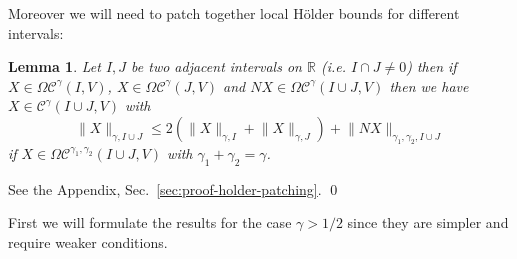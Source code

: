\documentclass[a4paper,12pt,reqno]{amsproc}
\newcommand{\NN}{N}
\newcommand{\CC}{\mathcal{C}}
\newcommand{\OCC}{\Omega \mathcal{C}}
\newcommand{\norm}[1]{\lVert #1\rVert}
\newtheorem{lemma}{Lemma}
\begin{document}
Moreover we will need to patch together local H\"older bounds for
different intervals:
\begin{lemma}
  \label{eq:holder-patching}
Let $I,J$ be two adjacent intervals on $\mathbb{R}$ (i.e. $I \cap J
\neq 0$) then if $X \in \OCC^{\gamma}(I,V)$, $X \in \OCC^{\gamma}(J,V)
$ and $\NN X \in \OCC^{\gamma}(I \cup J,V)$ then we
have $X \in \CC^{\gamma}(I \cup J,V)$ with
\begin{equation}
  \label{eq:patchbound}
  \norm{X}_{\gamma,I \cup J} \le      2
  (\norm{X}_{\gamma,I}+\norm{X}_{\gamma,J}) + \norm{\NN X}_{\gamma_1,\gamma_2,I
  \cup J}
\end{equation}
if $X \in \OCC^{\gamma_1,\gamma_2}(I \cup J,V)$ with
$\gamma_1+\gamma_2 = \gamma$.
\end{lemma}
\proof  See the Appendix, Sec.~\ref{sec:proof-holder-patching}. \qed

\bigskip



 First we will
formulate the results for the case $\gamma > 1/2$ since they are  simpler and
require weaker conditions.
\end{document}
